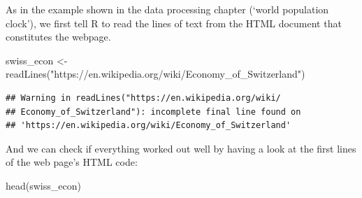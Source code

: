 \documentclass[
  12pt,
]{style/krantz}
\newenvironment{Shaded}{\begin{snugshade}}{\end{snugshade}}
\newcommand{\FunctionTok}[1]{\textcolor[rgb]{0.00,0.00,0.00}{#1}}
\newcommand{\NormalTok}[1]{#1}
\newcommand{\OtherTok}[1]{\textcolor[rgb]{0.56,0.35,0.01}{#1}}
\newcommand{\StringTok}[1]{\textcolor[rgb]{0.31,0.60,0.02}{#1}}
\begin{document}
As in the example shown in the data processing chapter (`world population clock'), we first tell R to read the lines of text from the HTML document that constitutes the webpage.

\begin{Shaded}
\begin{Highlighting}[]
\NormalTok{swiss\_econ }\OtherTok{\textless{}{-}} \FunctionTok{readLines}\NormalTok{(}\StringTok{"https://en.wikipedia.org/wiki/Economy\_of\_Switzerland"}\NormalTok{)}
\end{Highlighting}
\end{Shaded}

\begin{verbatim}
## Warning in readLines("https://en.wikipedia.org/wiki/
## Economy_of_Switzerland"): incomplete final line found on
## 'https://en.wikipedia.org/wiki/Economy_of_Switzerland'
\end{verbatim}

And we can check if everything worked out well by having a look at the first lines of the web page's HTML code:

\begin{Shaded}
\begin{Highlighting}[]
\FunctionTok{head}\NormalTok{(swiss\_econ)}
\end{Highlighting}
\end{Shaded}
\end{document}
